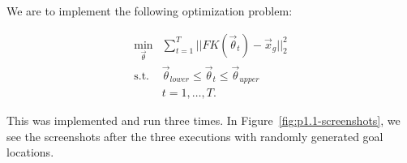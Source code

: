 \documentclass{article}
\begin{document}
We are to implement the following optimization problem:

\begin{align*}
  \min_{\vec{\theta}}
    &
      \sum_{t = 1}^T
      ||
      FK(\vec{\theta}_t) - \vec{x}_g
      ||^2_2
  \\
  \text{s.t.}
    &
      \vec{\theta}_{lower}
        \leq
      \vec{\theta}_t
        \leq
      \vec{\theta}_{upper}
  \\
    &
      t = 1, \ldots, T.
\end{align*}

This was implemented and run three times.
%
In Figure~\ref{fig:p1.1-screenshots}, we see the screenshots after the three
executions with randomly generated goal locations.
\end{document}
